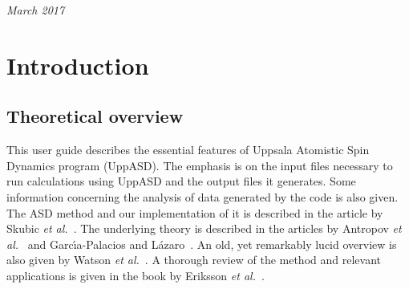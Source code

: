 \documentclass[11pt,fleqn,a4]{book} %
\begin{document}
\noindent \textit{March 2017} %




\pagestyle{empty} %

\tableofcontents %

\cleardoublepage %

\pagestyle{fancy} %





\chapter{Introduction}

\section{Theoretical overview}

This user guide describes the essential features of Uppsala Atomistic Spin Dynamics program (UppASD). The emphasis is on the input files necessary to run calculations using UppASD and the output files it generates. Some information concerning the analysis of data generated by the code is also given. The ASD method and our implementation of it is described in the article by Skubic \textit{et al.}~\cite{Skubic2008}. The underlying theory is described in the articles by Antropov \textit{et al.}~\cite{Antropov1996} and Garc\'{\i}a-Palacios and L\'azaro~\cite{Garcia-Palacios1998}. An old, yet remarkably lucid overview is also given by Watson \textit{et al.}~\cite{Watson1969}. A thorough review of the method and relevant applications is given in the book by Eriksson \textit{et al.}~\cite{Eriksson2017}.
\end{document}
